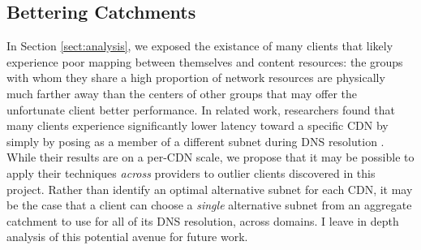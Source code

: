 \subsection{Bettering Catchments}

In Section \ref{sect:analysis}, we exposed the existance of many clients that
likely experience poor mapping between themselves and content resources: the
groups with whom they share a high proportion of network resources are
physically much farther away than the centers of other groups that may offer the
unfortunate client better performance. In related work, researchers found that
many clients experience significantly lower latency toward a specific CDN by
simply by posing as a member of a different subnet during DNS resolution \cite{warrior2017drongo}. While their results
are on a per-CDN scale, we propose that it may be possible to apply their
techniques \emph{across} providers to outlier clients discovered in this
project. Rather than identify an optimal alternative subnet for each CDN, it may
be the case that a client can choose a \emph{single} alternative subnet from an
aggregate catchment to use for all of its DNS resolution, across domains. I
leave in depth analysis of this potential avenue for future work.
